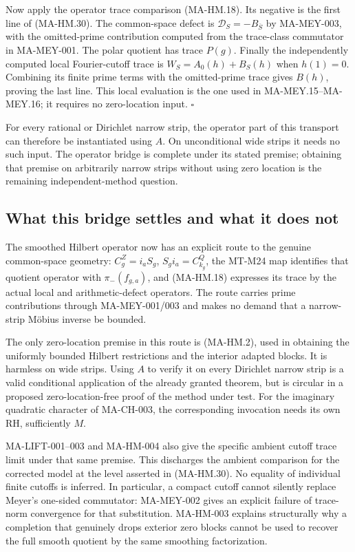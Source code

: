 Now apply the operator trace comparison
(MA-HM.18).  Its negative is the first line of
(MA-HM.30).  The common-space defect is
$\mathcal D_S=-B_{\overline S}$ by MA-MEY-003,
with the omitted-prime contribution computed
from the trace-class commutator in MA-MEY-001.
The polar quotient has trace $P(g)$.
Finally the independently computed local
Fourier-cutoff trace is
$W_S=A_0(h)+B_S(h)$ when $h(1)=0$.
Combining its finite prime terms with the
omitted-prime trace gives $B(h)$, proving the
last line.  This local evaluation is the one
used in MA-MEY.15--MA-MEY.16; it requires no
zero-location input.
\hfill$\square$

For every rational or Dirichlet narrow strip,
the operator part of this transport can therefore
be instantiated using $A$.  On unconditional
wide strips it needs no such input.  The
operator bridge is complete under its stated
premise; obtaining that premise on arbitrarily
narrow strips without using zero location is
the remaining independent-method question.

\subsection{What this bridge settles and what it does not}

The smoothed Hilbert operator now has an explicit route to
the genuine common-space geometry:
$C_g^Z=i_aS_g$, $S_gi_a=C_{k_g}^Q$, the MT-M24 map identifies
that quotient operator with $\pi_-(f_{g,a})$, and
(MA-HM.18) expresses its trace by the actual local and
arithmetic-defect operators.  The route carries prime
contributions through MA-MEY-001/003 and makes no demand
that a narrow-strip M\"obius inverse be bounded.

The only zero-location premise in this route is
(MA-HM.2), used in obtaining the uniformly bounded
Hilbert restrictions and the interior adapted blocks.
It is harmless on wide strips.  Using $A$ to verify it
on every Dirichlet narrow strip is a valid conditional
application of the already granted theorem, but is
circular in a proposed zero-location-free proof of the
method under test.  For the imaginary quadratic
character of MA-CH-003, the corresponding invocation
needs its own RH, sufficiently $M$.

MA-LIFT-001--003 and MA-HM-004 also give the
specific ambient cutoff trace limit under that same
premise.  This discharges the ambient comparison
for the corrected model at the level asserted in
(MA-HM.30).  No equality of individual finite
cutoffs is inferred.  In particular, a compact
cutoff cannot silently replace Meyer's one-sided
commutator: MA-MEY-002 gives an explicit failure
of trace-norm convergence for that substitution.
MA-HM-003 explains structurally why a completion
that genuinely drops exterior zero blocks cannot
be used to recover the full smooth quotient by
the same smoothing factorization.

